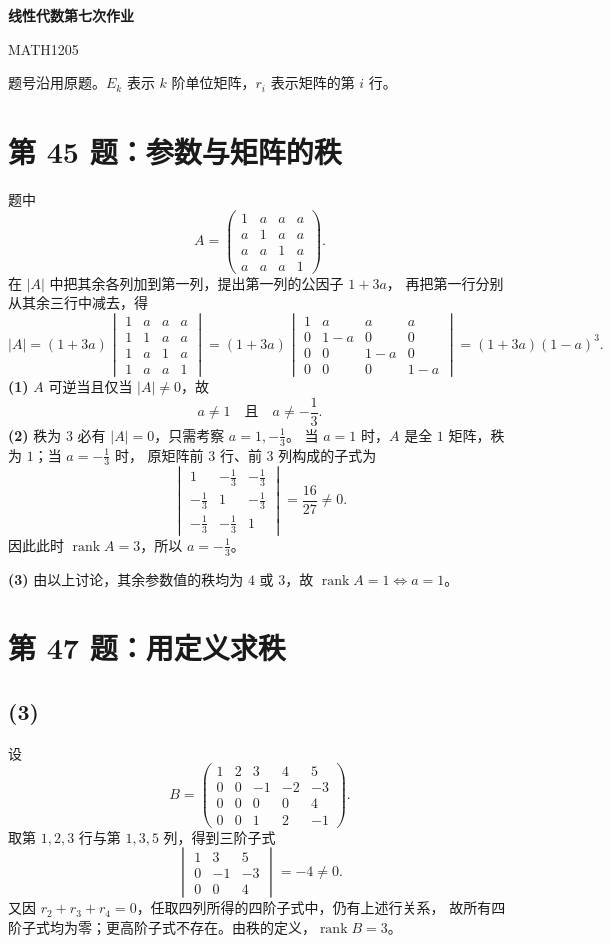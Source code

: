 \documentclass[11pt,a4paper,fontset=fandol]{ctexart}
\newcommand{\rk}{\operatorname{rank}}
\newcommand{\ans}[1]{\boxed{#1}}
\newcommand{\problem}[1]{\Needspace{8\baselineskip}\section*{#1}}
\newcommand{\parttitle}[1]{\Needspace{7\baselineskip}\subsection*{#1}}
\begin{document}
\setlength{\abovedisplayskip}{6pt plus 2pt minus 2pt}
\setlength{\belowdisplayskip}{6pt plus 2pt minus 2pt}
\setlength{\abovedisplayshortskip}{3pt plus 1pt minus 1pt}
\setlength{\belowdisplayshortskip}{4pt plus 1pt minus 1pt}
\begin{center}
{\LARGE\bfseries 线性代数第七次作业}\par
\vspace{0.3em}
{\small MATH1205}
\end{center}
\vspace{-0.4em}
题号沿用原题。$E_k$ 表示 $k$ 阶单位矩阵，$r_i$ 表示矩阵的第 $i$ 行。

\problem{第 45 题：参数与矩阵的秩}
题中
\[
A=\begin{pmatrix}
1&a&a&a\\a&1&a&a\\a&a&1&a\\a&a&a&1
\end{pmatrix}.
\]
在 $|A|$ 中把其余各列加到第一列，提出第一列的公因子 $1+3a$，
再把第一行分别从其余三行中减去，得
\[
|A|=(1+3a)
\begin{vmatrix}
1&a&a&a\\1&1&a&a\\1&a&1&a\\1&a&a&1
\end{vmatrix}
=(1+3a)
\begin{vmatrix}
1&a&a&a\\0&1-a&0&0\\0&0&1-a&0\\0&0&0&1-a
\end{vmatrix}
=(1+3a)(1-a)^3.
\]
\textbf{(1)} $A$ 可逆当且仅当 $|A|\ne0$，故
\[
\ans{a\ne1\quad\text{且}\quad a\ne-\frac13}.
\]
\textbf{(2)} 秩为 $3$ 必有 $|A|=0$，只需考察 $a=1,-\frac13$。
当 $a=1$ 时，$A$ 是全 $1$ 矩阵，秩为 $1$；当 $a=-\frac13$ 时，
原矩阵前 $3$ 行、前 $3$ 列构成的子式为
\[
\begin{vmatrix}
1&-\frac13&-\frac13\\
-\frac13&1&-\frac13\\
-\frac13&-\frac13&1
\end{vmatrix}=\frac{16}{27}\ne0.
\]
因此此时 $\rk A=3$，所以 $\ans{a=-\frac13}$。

\textbf{(3)} 由以上讨论，其余参数值的秩均为 $4$ 或 $3$，故
$\ans{\rk A=1\iff a=1}$。

\problem{第 47 题：用定义求秩}
\parttitle{(3)}
设
\[
B=\begin{pmatrix}
1&2&3&4&5\\0&0&-1&-2&-3\\0&0&0&0&4\\0&0&1&2&-1
\end{pmatrix}.
\]
取第 $1,2,3$ 行与第 $1,3,5$ 列，得到三阶子式
\[
\begin{vmatrix}1&3&5\\0&-1&-3\\0&0&4\end{vmatrix}=-4\ne0.
\]
又因 $r_2+r_3+r_4=0$，任取四列所得的四阶子式中，仍有上述行关系，
故所有四阶子式均为零；更高阶子式不存在。由秩的定义，$\ans{\rk B=3}$。
\end{document}
